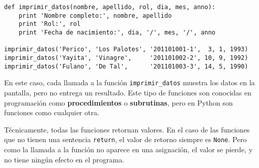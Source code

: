 \begin{lstlisting}
def imprimir_datos(nombre, apellido, rol, dia, mes, anno):
    print 'Nombre completo:', nombre, apellido
    print 'Rol:', rol
    print 'Fecha de nacimiento:', dia, '/', mes, '/', anno

imprimir_datos('Perico', 'Los Palotes', '201101001-1',  3, 1, 1993)
imprimir_datos('Yayita', 'Vinagre',     '201101002-2', 10, 9, 1992)
imprimir_datos('Fulano', 'De Tal',      '201101003-3', 14, 5, 1990)
\end{lstlisting}

En este caso, cada llamada a la función \lstinline!imprimir_datos!
muestra los datos en la pantalla, pero no entrega un resultado. Este
tipo de funciones son conocidas en programación como
\textbf{procedimientos} o \textbf{subrutinas}, pero en Python son
funciones como cualquier otra.

Técnicamente, todas las funciones retornan valores. En el caso de las
funciones que no tienen una sentencia \lstinline!return!, el valor de
retorno siempre es \lstinline!None!. Pero como la llamada a la función
no aparece en una asignación, el valor se pierde, y no tiene ningún
efecto en el programa.
